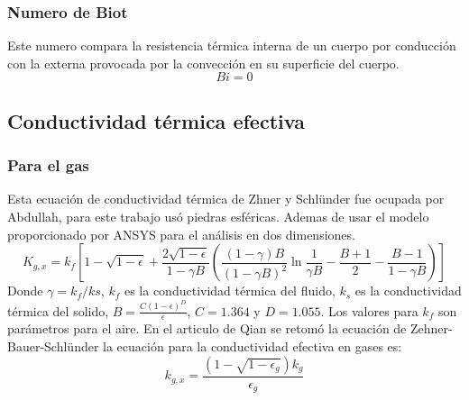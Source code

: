 \documentclass[12pt,letterpaper,final]{article}%
\begin{document}
\subsubsection{Numero de Biot}
Este numero compara la resistencia térmica interna de un cuerpo por conducción con la  externa provocada por la convección en su superficie del cuerpo.
\begin{equation}\label{Ecu_biot}
Bi = 0	
\end{equation}
\subsection{Conductividad térmica efectiva}
\subsubsection{Para el gas}
Esta ecuación de conductividad térmica de Zhner y Schlünder\cite{zehner1970} fue ocupada por Abdullah, para este trabajo usó piedras esféricas. Ademas de usar el modelo proporcionado por ANSYS para el análisis en dos dimensiones. \cite{ALI2025}
\begin{equation}\label{Kgx_Zenner}
	K_{g,x}= k_f \left[ 1 - \sqrt{1-\epsilon} + \frac{2\sqrt{1-\epsilon}}{1- \gamma B} \left( \frac{(1-\gamma)B}{(1-\gamma B)^2}\ln \frac{1}{\gamma B} - \frac{B+1}{2}-\frac{B-1}{1-\gamma B}    \right)\right]
\end{equation}
Donde $\gamma = k_f/ks$, $k_f$ es la conductividad térmica del fluido, $k_s$ es la conductividad térmica del solido, $B=\frac{C(1-\epsilon)^D}{\epsilon}$, $C=1.364$ y $D=1.055$. Los valores para $k_f$ son parámetros para el aire.
\newline
En el articulo de Qian \cite{QIAN2018} se retomó la ecuación de Zehner-Bauer-Schlünder la ecuación para la conductividad efectiva en gases es:
\begin{equation}\label{Kgx_ZBS}
	k_{g,x}= \frac{ \left( 1 - \sqrt{1-\epsilon_g} \right)k_g }{\epsilon_g}
\end{equation}
\end{document}
